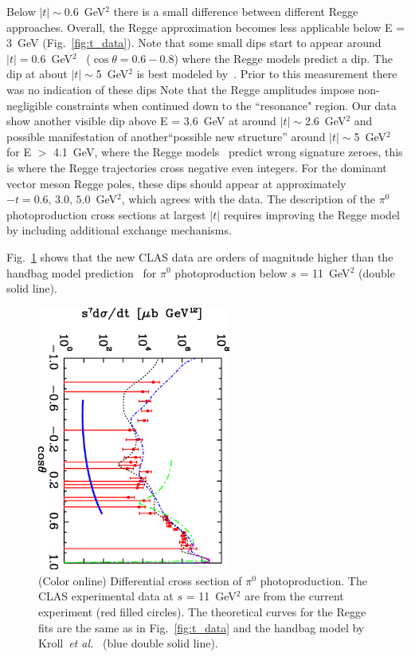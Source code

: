 \documentclass[aps,prc,twocolumn,floatfix,showpacs,preprintnumbers,amsmath,amssymb,superscriptaddress,linenumbers]{revtex4-1}
\begin{document}
Below $|t|\sim$0.6~GeV$^2$ there is a small difference between 
different Regge approaches.  Overall, the Regge approximation 
becomes less applicable below E = 3~GeV (Fig.~\ref{fig:t_data}).  
Note that some small dips start to appear around $|t| = 0.6$~GeV$^2$
~($\cos\theta = 0.6-0.8$) where the Regge models predict a dip.  
The dip at about $|t|\sim$5~GeV$^2$ is best modeled by~\cite{Mathieu:2015eia}. Prior to this measurement there was no indication of these dips
Note that the Regge amplitudes impose non-negligible constraints when continued down to the 
``resonance" region.
Our data show another visible dip above E = 3.6~GeV at around $|t|\sim$2.6~GeV$^2$ and possible manifestation of another``possible new structure'' around $|t|\sim$5~GeV$^2$ for E $>$ 4.1~GeV, where the Regge models~\cite{Goldstein:1973xn,
Laget:2005be,Donnachie:2015jaa} predict wrong signature zeroes, 
this is where the Regge trajectories cross negative even integers. 
For the dominant vector meson Regge poles, these dips should appear 
at approximately $-t=0.6, \, 3.0, \, 5.0$~GeV$^2$,  which agrees 
with the data.  The description of the $\pi^0$ photoproduction 
cross sections at largest $|t|$ requires improving the 
Regge model by including additional exchange mechanisms.

Fig.~\ref{fig:kroll} shows that the new CLAS data are orders of 
magnitude higher than the handbag model prediction~\cite{Huang:2000kd} for $\pi^0$ 
photoproduction below $s$ = 11~GeV$^2$ (double 
solid line).
\begin{figure}
\centerline{
        \includegraphics[width=2.5in, angle=90]{kroll.eps}}

        \caption {(Color online) Differential cross section 
	of $\pi^0$ photoproduction. The CLAS experimental data 
	at $s$ = 11~GeV$^2$ are from the current experiment (red 
	filled circles). The theoretical curves for the Regge 
	fits are the same as in Fig.~\protect\ref{fig:t_data} 
	and the handbag model by Kroll~\textit{et 
	al.}~\protect\cite{Huang:2000kd} (blue double solid 
	line).} \label{fig:kroll}
\end{figure}
\end{document}
